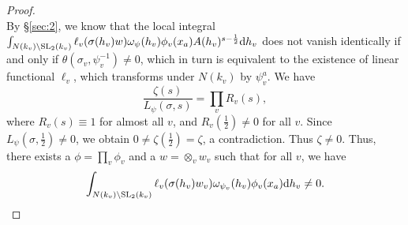 \begin{proof}
\[\]
By \S \ref{sec:2}, we know that the local integral $\int_{N(k_v) \backslash \mathrm{SL}_2(k_v)} \ell_v(\sigma(h_v)w) \omega_\psi(h_v)\phi_v(x_a) A(h_v)^{s -\frac{1}{2}} \mathrm{d} h_v$ does not vanish identically if and only if $\theta(\sigma_v, \psi_v^{-1}) \neq 0$, which in turn is equivalent to the existence of linear functional $\ell_v$, which transforms under $N(k_v)$ by $\psi_v^a$.
We have
\[
\frac{\zeta(s)}{L_\psi(\sigma, s)} = \prod_v R_v(s),
\]
where $R_v(s) \equiv 1$ for almost all $v$, and $R_v(\frac{1}{2}) \neq 0$ for all $v$.
Since $L_\psi(\sigma, \frac{1}{2}) \neq 0$, we obtain $0 \neq \zeta(\frac{1}{2}) = \zeta$, a contradiction.
Thus $\zeta \neq 0$.
Thus, there exists a $\phi = \prod_v \phi_v$ and a $w = \otimes_v w_v$ such that for all $v$, we have
\[
\int_{N(k_v) \backslash \mathrm{SL}_2(k_v)}  \ell_v(\sigma(h_v) w_v) \omega_{\psi_v}(h_v) \phi_v(x_a) \mathrm{d} h_v \neq 0.
\]
\end{proof}

